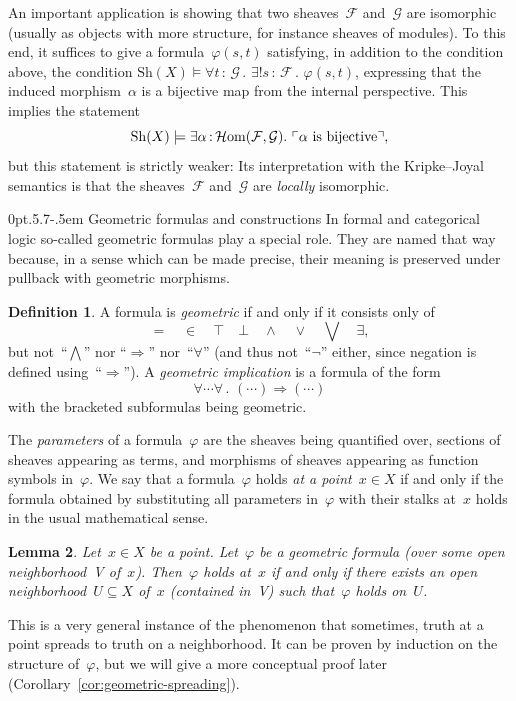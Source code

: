 \documentclass[10pt,reqno,a4paper]{amsbook}
\makeatletter
\theoremstyle{definition}
\newtheorem{defn}{Definition}[section]
\theoremstyle{plain}
\newtheorem{lemma}[defn]{Lemma}
\theoremstyle{remark}
\newcommand{\F}{\mathcal{F}}
\renewcommand{\G}{\mathcal{G}}
\newcommand{\HOM}{\mathcal{H}\mathrm{om}}
\newcommand{\Sh}{\mathrm{Sh}}
\newcommand{\?}{\,{:}\,}
\renewcommand{\_}{\mathpunct{.}\,}
\newcommand{\speak}[1]{\ulcorner\text{\textnormal{#1}}\urcorner}
\renewenvironment{proof}[1][\proofname]{\par
  \pushQED{\qed}%
  \normalfont \topsep6\p@\@plus6\p@\relax
  \trivlist
  \item[\hskip\labelsep
        \itshape
    #1\@addpunct{.}]\ignorespaces
}{%
  \popQED\endtrivlist\@endpefalse
}
\def\subsection{\@startsection{subsection}{2}%
  {0pt}{.5\linespacing\@plus.7\linespacing}{-.5em}%
  {\normalfont\bfseries}}
\makeatother
\begin{document}
An important application is showing that two sheaves~$\F$ and~$\G$ are
isomorphic (usually as objects with more structure, for instance sheaves of
modules). To this end, it suffices to give a formula~$\varphi(s,t)$ satisfying,
in addition to the condition above, the condition
$\Sh(X) \models \forall t\?\G\_ \exists! s\?\F\_ \varphi(s,t)$,
expressing that the induced morphism~$\alpha$ is a bijective map from the
internal perspective. This implies the statement
\[ \Sh(X) \models \exists \alpha\?\HOM(\F,\G)\_ \speak{$\alpha$ is bijective},
\]
but this statement is strictly weaker: Its interpretation with the
Kripke--Joyal semantics is that the sheaves~$\F$ and~$\G$ are \emph{locally}
isomorphic.


\subsection{Geometric formulas and
constructions}\label{sect:geometric-formulas-and-constructions}
In formal and categorical logic so-called geometric formulas play a
special role. They are named that way because, in a sense which can be made
precise, their meaning is preserved under pullback with geometric morphisms.
\begin{defn}\label{defn:geometric-formulas}
A formula is \emph{geometric} if and only if it consists only of
\[ {=} \quad {\in} \quad {\top} \quad {\bot} \quad {\wedge} \quad {\vee} \quad
{\bigvee} \quad {\exists}, \]
but not~``$\bigwedge$'' nor ``$\Rightarrow$'' nor~``$\forall$'' (and thus
not~``$\neg$'' either, since negation is defined using~``$\Rightarrow$'').
A \emph{geometric implication} is a formula of the form
\[ \forall \cdots \forall\_ (\cdots) \Rightarrow (\cdots) \]
with the bracketed subformulas being geometric.
\end{defn}
The \emph{parameters} of a formula~$\varphi$ are the sheaves
being quantified over, sections of sheaves appearing as terms, and morphisms of
sheaves appearing as function symbols in~$\varphi$.
We say that a formula~$\varphi$ holds \emph{at a point~$x \in X$} if and only
if the formula obtained by substituting all parameters in~$\varphi$ with their
stalks at~$x$ holds in the usual mathematical sense.

\begin{lemma}\label{lemma:geometric-stalk-neighborhood}
Let~$x \in X$ be a point. Let~$\varphi$ be a geometric formula (over some open
neighborhood~V of~$x$).
Then~$\varphi$ holds at~$x$ if and only if there exists an open neighborhood~$U
\subseteq X$ of~$x$ (contained in~V) such that~$\varphi$ holds on~$U$.
\end{lemma}
\begin{proof}This is a very general instance of the phenomenon that sometimes,
truth at a point spreads to truth on a neighborhood. It can be proven by
induction on the structure of~$\varphi$, but we will give a more conceptual
proof later (Corollary~\ref{cor:geometric-spreading}).
\end{proof}
\end{document}
